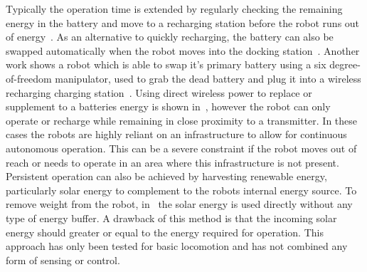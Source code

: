 Typically the operation time is extended by regularly checking the remaining energy in the battery and move to a recharging station before the robot runs out of energy~\cite{pickem_icra_2015, rubenstein_icra_2012}.
As an alternative to quickly recharging, the battery can also be swapped automatically when the robot moves into the docking station~\cite{kemal_mech_2015}.
Another work shows a robot which is able to swap it's primary battery using a six degree-of-freedom manipulator, used to grab the dead battery and plug it into a wireless recharging charging station~\cite{zhang_conel_2013}.
Using direct wireless power to replace or supplement to a batteries energy is shown in~\cite{karpelson_icra_2014}, however the robot can only operate or recharge while remaining in close proximity to a transmitter. 
In these cases the robots are highly reliant on an infrastructure to allow for continuous autonomous operation.
This can be a severe constraint if the robot moves out of reach or needs to operate in an area where this infrastructure is not present. 
Persistent operation can also be achieved by harvesting renewable energy, particularly solar energy to complement to the robots internal energy source. 
To remove weight from the robot, in~\cite{bruhwiler_iros_2015} the solar energy is used directly without any type of energy buffer. 
A drawback of this method is that the incoming solar energy should greater or equal to the energy required for operation. 
This approach has only been tested for basic locomotion and has not combined any form of sensing or control.




